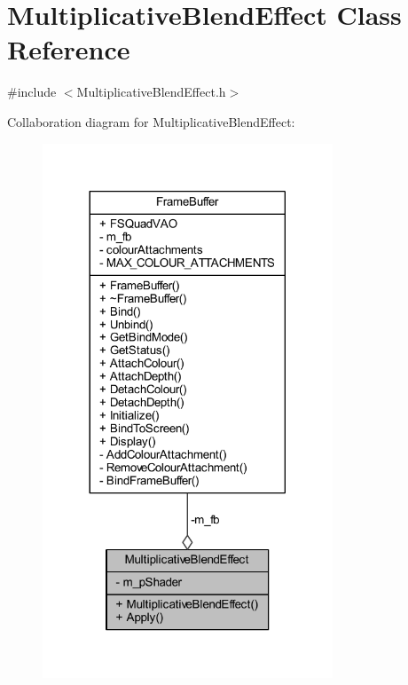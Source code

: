 \hypertarget{class_multiplicative_blend_effect}{}\section{Multiplicative\+Blend\+Effect Class Reference}
\label{class_multiplicative_blend_effect}


{\ttfamily \#include $<$Multiplicative\+Blend\+Effect.\+h$>$}



Collaboration diagram for Multiplicative\+Blend\+Effect\+:\nopagebreak
\begin{figure}[H]
\begin{center}
\leavevmode
\includegraphics[width=245pt]{class_multiplicative_blend_effect__coll__graph}
\end{center}
\end{figure}
